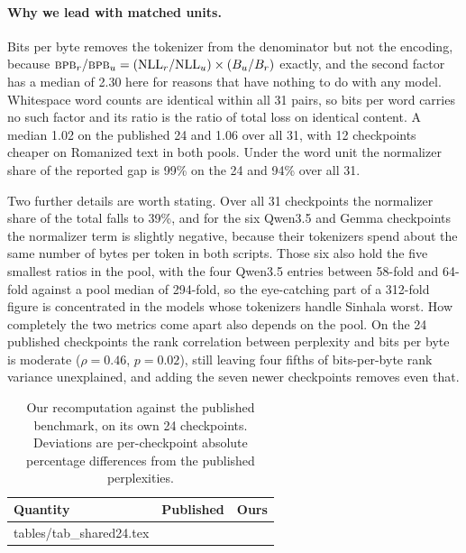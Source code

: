 \documentclass{article}
\makeatletter
\newcommand{\bpb}{\textsc{bpb}}
\newcommand{\rows}[1]{\@@input #1 }
\makeatother
\begin{document}
\paragraph{Why we lead with matched units.} Bits per byte removes the tokenizer from the
denominator but not the encoding, because
$\bpb_r/\bpb_u = (\mathrm{NLL}_r/\mathrm{NLL}_u) \times (B_u/B_r)$ exactly, and the
second factor has a median of 2.30 here for reasons that have nothing to do with any
model. Whitespace word counts are identical within all 31 pairs, so bits per word carries
no such factor and its ratio is the ratio of total loss on identical content. A median
1.02 on the published 24 and 1.06 over all 31, with 12 checkpoints cheaper on Romanized
text in both pools. Under the word unit the normalizer share of the reported gap is 99\%
on the 24 and 94\% over all 31.

Two further details are worth stating. Over all 31 checkpoints the normalizer share of the
total falls to 39\%, and for the six Qwen3.5 and Gemma checkpoints the normalizer
term is slightly negative, because their tokenizers spend about the same number of
bytes per token in both scripts. Those six also hold the five smallest ratios in the
pool, with the four Qwen3.5 entries between 58-fold and 64-fold against a pool median
of 294-fold, so the eye-catching part of a 312-fold figure is concentrated in the
models whose tokenizers handle Sinhala worst. How completely the two metrics come
apart also depends on the pool. On the 24 published checkpoints the rank correlation
between perplexity and bits per byte is moderate ($\rho = 0.46$, $p = 0.02$), still
leaving four fifths of bits-per-byte rank variance unexplained, and adding the seven
newer checkpoints removes even that.

\begin{table}[t]
\caption{Our recomputation against the published benchmark, on its own 24
checkpoints. Deviations are per-checkpoint absolute percentage differences from the
published perplexities.}
\label{tab:shared24}
\centering\footnotesize
\setlength{\tabcolsep}{2.4pt}
\begin{tabular}{@{}lrr@{}}
\toprule
\textbf{Quantity} & \textbf{Published} & \textbf{Ours} \\
\midrule
\rows{tables/tab_shared24.tex}
\bottomrule
\end{tabular}
\end{table}
\end{document}
